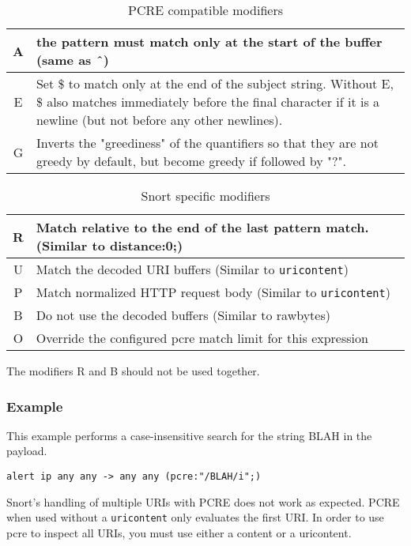 \documentclass[english]{report}
\newenvironment{note}{
\samepage
    \vspace{10pt}{\textsf{
        {\hspace{7pt}\Huge{$\triangle$\hspace{-12.5pt}{\Large{$^!$}}}}\hspace{5pt}
        {\Large{NOTE}}
    }
    }
   \begin{center}
    \par\vspace{-17pt}

    \begin{lrbox}{\savepar}
    \begin{minipage}[r]{6in}
}
{
    \end{minipage}
    \end{lrbox}
    \fbox{
        \usebox{
            \savepar
	}
    }
    \par\vskip10pt
    \end{center}
}
\newenvironment{note}{
        \begin{rawhtml}
        <p><table border="1"><tr><td><b>
        Note:&nbsp;&nbsp;</b>
        \end{rawhtml}
}{
        \begin{rawhtml}
        </b></td></tr></table></p>
        \end{rawhtml}
}
\begin{document}
\begin{longtable}{|c|p{3.5in}|}
\caption{PCRE compatible modifiers} \\
\hline
A & the pattern must match only at the start of the buffer (same as \^\ ) \\
\hline
E & Set \$ to match only at the end of the subject string.  Without E, \$ also matches immediately before the final character if it is a newline (but not before any other newlines). \\
\hline
G & Inverts the "greediness" of the quantifiers so that they are not greedy by default, but become greedy if followed by "?". \\
\hline
\end{longtable}

\begin{longtable}{|c|p{3.5in}|}
\caption{Snort specific modifiers} \\
\hline
R & Match relative to the end of the last pattern match.  (Similar to distance:0;) \\
\hline
U & Match the decoded URI buffers (Similar to \texttt{uricontent}) \\
\hline
P & Match normalized HTTP request body (Similar to \texttt{uricontent}) \\
\hline
B & Do not use the decoded buffers (Similar to rawbytes) \\
\hline
O & Override the configured pcre match limit for this expression \\
\hline
\end{longtable}

The modifiers R and B should not be used together.

\subsubsection{Example}

This example performs a case-insensitive search for the string BLAH in the payload.

\begin{verbatim}
alert ip any any -> any any (pcre:"/BLAH/i";)
\end{verbatim}

\begin{note}
Snort's handling of multiple URIs with PCRE does not work as expected.  PCRE when used without a \texttt{uricontent} only evaluates the first URI.  In order to use pcre to inspect all URIs, you must use either a content or a uricontent.
\end{note}
\end{document}
